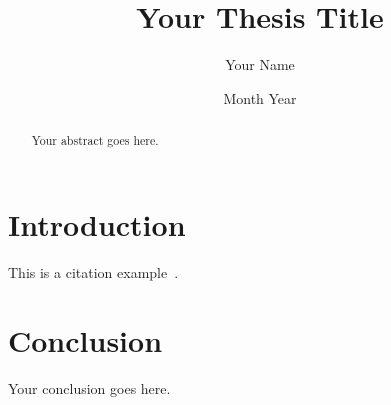 \documentclass[12pt, a4paper]{report}
\begin{document}
\title{Your Thesis Title}
\author{Your Name}
\date{Month Year}
\maketitle

\begin{abstract}
Your abstract goes here.
\end{abstract}

\tableofcontents

\chapter{Introduction}
This is a citation example~\cite{einstein1905}.








\chapter{Conclusion}
Your conclusion goes here.

\end{document}
